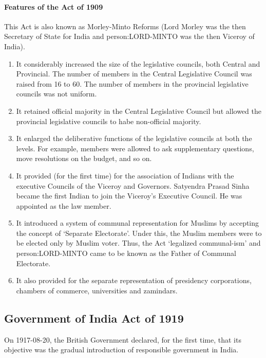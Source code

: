 \paragraph{Features of the Act of 1909}
This Act is also known as Morley-Minto Reforms (Lord Morley was the then Secretary of State for India and \gls{person:LORD-MINTO} was the then Viceroy of India).
\begin{enumerate}
  \item It considerably increased the size of the legislative councils, both Central and Provincial. The number of members in the Central Legislative Council was raised from 16 to 60. The number of members in the provincial legislative councils was not uniform.
  \item It retained official majority in the Central Legislative Council but allowed the provincial legislative councils to habe non-official majority.
  \item It enlarged the deliberative functions of the legislative councils at both the levels. For example, members were allowed to ask supplementary questions, move resolutions on the budget, and so on.
  \item It provided (for the first time) for the association of Indians with the executive Councils of the Viceroy and Governors. Satyendra Prasad Sinha became the first Indian to join the Viceroy's Executive Council. He was appointed as the law member.
  \item It introduced a system of communal representation for Muslims by accepting the concept of `Separate Electorate'. Under this, the Muslim members were to be elected only by Muslim voter. Thus, the Act `legalized communal-ism' and \gls{person:LORD-MINTO} came to be known as the Father of Communal Electorate.
  \item It also provided for the separate representation of presidency corporations, chambers of commerce, universities and zamindars.
\end{enumerate}

\subsection{Government of India Act of 1919}

On 1917-08-20, the British Government declared, for the first time, that its objective was the gradual introduction of responsible government in India.

